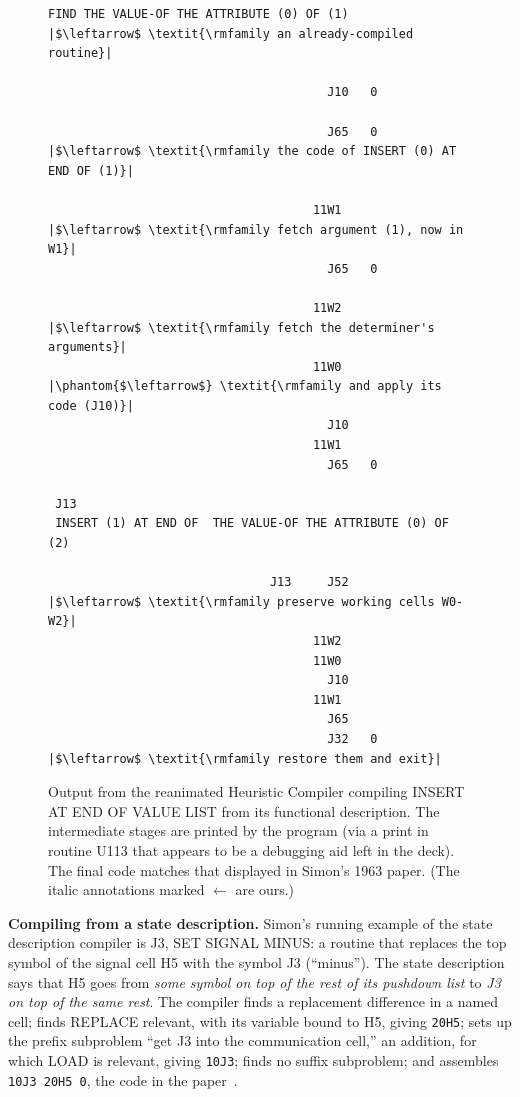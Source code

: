 \documentclass[11pt]{article}
\begin{document}
\begin{figure}[H]
\begin{lstlisting}[escapechar=|]
 FIND THE VALUE-OF THE ATTRIBUTE (0) OF (1)              |$\leftarrow$ \textit{\rmfamily an already-compiled routine}|

                                       J10   0

                                       J65   0           |$\leftarrow$ \textit{\rmfamily the code of INSERT (0) AT END OF (1)}|

                                     11W1                |$\leftarrow$ \textit{\rmfamily fetch argument (1), now in W1}|
                                       J65   0

                                     11W2                |$\leftarrow$ \textit{\rmfamily fetch the determiner's arguments}|
                                     11W0                   |\phantom{$\leftarrow$} \textit{\rmfamily and apply its code (J10)}|
                                       J10
                                     11W1
                                       J65   0

 J13
 INSERT (1) AT END OF  THE VALUE-OF THE ATTRIBUTE (0) OF (2)

                               J13     J52               |$\leftarrow$ \textit{\rmfamily preserve working cells W0-W2}|
                                     11W2
                                     11W0
                                       J10
                                     11W1
                                       J65
                                       J32   0           |$\leftarrow$ \textit{\rmfamily restore them and exit}|
\end{lstlisting}
\caption{Output from the reanimated Heuristic Compiler compiling
  INSERT AT END OF VALUE LIST from its functional description. The
  intermediate stages are printed by the program (via a print in
  routine U113 that appears to be a debugging aid left in the
  deck). The final code matches that displayed in Simon's 1963 paper.
  (The italic annotations marked $\leftarrow$ are ours.)}
\label{fig:insert}
\end{figure}

\textbf{Compiling from a state description.} Simon's running example
of the state description compiler is J3, SET SIGNAL MINUS: a routine
that replaces the top symbol of the signal cell H5 with the symbol J3
(``minus''). The state description says that H5 goes from \emph{some
symbol on top of the rest of its pushdown list} to \emph{J3 on top of
the same rest}. The compiler finds a replacement difference in a named
cell; finds REPLACE relevant, with its variable bound to H5, giving
\texttt{20H5}; sets up the prefix subproblem ``get J3 into the
communication cell,'' an addition, for which LOAD is relevant, giving
\texttt{10J3}; finds no suffix subproblem; and assembles \texttt{10J3
  20H5 0}, the code in the paper~\cite[p.~498]{simon1963jacm}.
\end{document}
